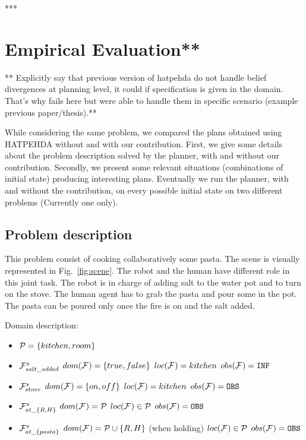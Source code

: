 \documentclass[letterpaper]{article} %
\begin{document}
***

\section{Empirical Evaluation**}

** Explicitly say that previous version of hatpehda do not handle belief divergences at planning level, it could if specification is given in the domain. That's why fails here but were able to handle them in specific scenario (example previous paper/thesis).**

While considering the same problem, we compared the plans obtained using HATPEHDA without and with our contribution. First, we give some details about the problem description solved by the planner, with and without our contribution. Secondly, we present some relevant situations (combinations of initial state) producing interesting plans. Eventually we run the planner, with and without the contribution, on every possible initial state on two different problems (Currently one only).  

\subsection{Problem description}

This problem consist of cooking collaboratively some pasta. The scene is visually represented in Fig.~\ref{fig:scene}.
The robot and the human have different role in this joint task. The robot is in charge of adding salt to the water pot and to turn on the stove. The human agent has to grab the pasta and pour some in the pot. The pasta can be poured only once the fire is on and the salt added. 

Domain description:

\begin{itemize}
    \item $\mathcal{P} = \{ kitchen, room \}$
    
    \item $\mathcal{F}^{s}_{salt\_added}$
        \subitem $dom(\mathcal{F}^{}_{}) = \{ true, false \}$
        \subitem $loc(\mathcal{F}^{}_{}) = kitchen$
        \subitem $obs(\mathcal{F}^{}_{}) = \texttt{INF}$

    \item $\mathcal{F}^{s}_{stove}$
        \subitem $dom(\mathcal{F}^{}_{}) = \{ on, off \}$ 
        \subitem $loc(\mathcal{F}^{}_{}) = kitchen$ 
        \subitem $obs(\mathcal{F}^{}_{}) = \texttt{OBS}$ 
    
    \item $\mathcal{F}^{s}_{at\_\{R,H\}}$
        \subitem $dom(\mathcal{F}^{}_{}) = \mathcal{P}$ 
        \subitem $loc(\mathcal{F}^{}_{}) \in  \mathcal{P}$ 
        \subitem $obs(\mathcal{F}^{}_{}) = \texttt{OBS}$ 

    \item $\mathcal{F}^{s}_{at\_\{pasta\}}$
        \subitem $dom(\mathcal{F}^{}_{}) = \mathcal{P} \cup \{ R, H \}$ (when holding)
        \subitem $loc(\mathcal{F}^{}_{}) \in  \mathcal{P}$ 
        \subitem $obs(\mathcal{F}^{}_{}) = \texttt{OBS}$ 
    
\end{itemize}
\end{document}

